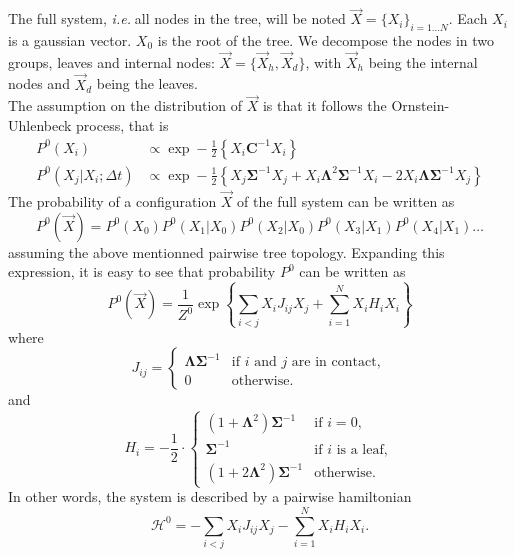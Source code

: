 \documentclass[10pt]{article}
\newcommand{\ie}{\emph{i.e.}$\;$}
\newcommand{\Lam}{\bm{\Lambda}}
\newcommand{\Sig}{\bm{\Sigma}}
\begin{document}
The full system, \ie all nodes in the tree, will be noted $\vec{X} = \{X_i\}_{i=1\ldots N}$. Each $X_i$ is a gaussian vector. $X_0$ is the root of the tree. We decompose the nodes in two groups, leaves and internal nodes: $\vec{X} = \{\vec{X}_h,\vec{X}_d\}$, with $\vec{X}_h$ being the internal nodes and $\vec{X}_d$ being the leaves. \\
The assumption on the distribution of $\vec{X}$ is that it follows the Ornstein-Uhlenbeck process, that is 
\begin{equation}
  \label{eq:ML_OU}
  \begin{split}
    P^0(X_i) &\propto \exp-\frac{1}{2}\left\{ X_i\bm{C}^{-1}X_i \right\}\\
    P^0(X_j|X_i;\Delta t) &\propto \exp-\frac{1}{2}\left\{ X_j\Sig^{-1}X_j + X_i\Lam^2\Sig^{-1} X_i - 2 X_i \Lam\Sig^{-1} X_j \right\}
  \end{split}
\end{equation}
The probability of a configuration $\vec{X}$ of the full system can be written as 
$$ P^0(\vec{X}) = P^0(X_0)P^0(X_1|X_0)P^0(X_2|X_0)P^0(X_3|X_1)P^0(X_4|X_1)\ldots $$
assuming the above mentionned pairwise tree topology. Expanding this expression, it is easy to see that probability $P^0$ can be written as
\begin{equation}
  \label{eq:ML_PairwiseDistribution}
  P^0(\vec{X}) = \frac{1}{Z^0}\exp\left\{ \sum_{i<j}X_iJ_{ij}X_j + \sum_{i=1}^N X_iH_iX_i  \right\}
\end{equation}
where 
\begin{equation*}
J_{ij} =
\begin{cases}
\Lam\Sig^{-1} & \text{if $i$ and $j$ are in contact} ,\\
0 & \text{otherwise}.
\end{cases}
\end{equation*}
and 
\begin{equation*}
H_i = -\frac{1}{2}\cdot
\begin{cases}
(1+\Lam^2)\Sig^{-1} & \text{if $i=0$},\\
\Sig^{-1} & \text{if $i$ is a leaf},\\
(1+2\Lam^2)\Sig^{-1} & \text{otherwise}.
\end{cases}
\end{equation*}
In other words, the system is described by a pairwise hamiltonian 
\begin{equation}
   \label{eq:ML_H0}
   \mathcal{H}^0 = -\sum_{i<j}X_iJ_{ij}X_j - \sum_{i=1}^N X_iH_iX_i.   
\end{equation}
\end{document}
